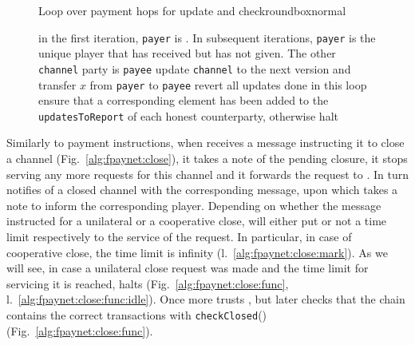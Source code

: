   \begin{figure}[H]
    \begin{titlebox}{\normalfont Loop over payment hops for update and
    check}{roundbox}{normal}
      \begin{algorithmic}[1]
        \label{alg:fpaynet:resolvepay:loops:update:loop}
          \State in the first iteration, \texttt{payer} is \dave. In
          subsequent iterations, \texttt{payer} is the unique player that
          has received but has not given. The other \texttt{channel} party
          is \texttt{payee}
            \State update \texttt{channel} to the next version and
            transfer $x$ from \texttt{payer} to \texttt{payee}
            \label{alg:fpaynet:resolvepay:loops:update:do}
          \Else
            \State revert all updates done in this loop
          \EndIf
        \EndFor
        \label{alg:fpaynet:resolvepay:loops:halt:loop}
          \State ensure that a corresponding element has been added to
          the \texttt{updatesToReport} of each honest counterparty,
          otherwise halt
          \label{alg:fpaynet:resolvepay:loops:halt:do}
        \EndFor
      \end{algorithmic}
    \end{titlebox}
    \caption{}
    \label{alg:fpaynet:resolvepay:loops}
  \end{figure}

  Similarly to payment instructions, when \fpaynet{} receives a message
  instructing it to close a channel (Fig.~\ref{alg:fpaynet:close}), it takes a
  note of the pending closure, it stops serving any more requests for this
  channel and it forwards the request to \simulator. In turn \simulator{}
  notifies \fpaynet{} of a closed channel with the corresponding message, upon
  which \fpaynet{} takes a note to inform the corresponding player. Depending on
  whether the message instructed for a unilateral or a cooperative close,
  \fpaynet{} will either put or not a time limit respectively to the service of
  the request. In particular, in case of cooperative close, the time limit is
  infinity (l.~\ref{alg:fpaynet:close:mark}). As we will see, in case a
  unilateral close request was made and the time limit for servicing it is
  reached, \fpaynet{} halts (Fig.~\ref{alg:fpaynet:close:func},
  l.~\ref{alg:fpaynet:close:func:idle}). Once more \fpaynet{} trusts \simulator,
  but later checks that the chain contains the correct transactions with
  \texttt{checkClosed}() (Fig.~\ref{alg:fpaynet:close:func}).

